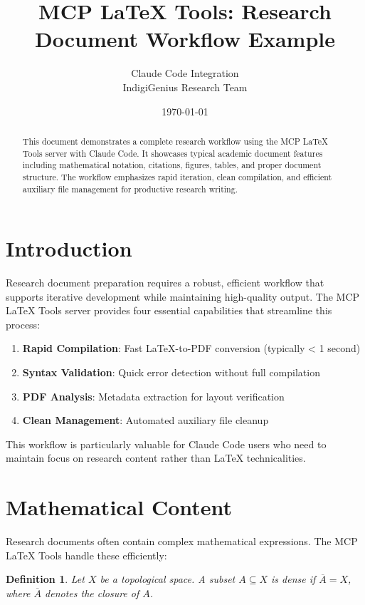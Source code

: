 \documentclass[12pt]{article}
\title{MCP LaTeX Tools: Research Document Workflow Example}
\author{Claude Code Integration\\
        IndigiGenius Research Team}
\date{\today}
\newtheorem{definition}{Definition}
\begin{document}
\maketitle

\doublespacing

\begin{abstract}
This document demonstrates a complete research workflow using the MCP LaTeX Tools server with Claude Code. It showcases typical academic document features including mathematical notation, citations, figures, tables, and proper document structure. The workflow emphasizes rapid iteration, clean compilation, and efficient auxiliary file management for productive research writing.
\end{abstract}

\section{Introduction}

Research document preparation requires a robust, efficient workflow that supports iterative development while maintaining high-quality output. The MCP LaTeX Tools server provides four essential capabilities that streamline this process:

\begin{enumerate}
    \item \textbf{Rapid Compilation}: Fast LaTeX-to-PDF conversion (typically < 1 second)
    \item \textbf{Syntax Validation}: Quick error detection without full compilation
    \item \textbf{PDF Analysis}: Metadata extraction for layout verification
    \item \textbf{Clean Management}: Automated auxiliary file cleanup
\end{enumerate}

This workflow is particularly valuable for Claude Code users who need to maintain focus on research content rather than LaTeX technicalities.

\section{Mathematical Content}

Research documents often contain complex mathematical expressions. The MCP LaTeX Tools handle these efficiently:

\begin{definition}
Let $X$ be a topological space. A subset $A \subseteq X$ is \emph{dense} if $\overline{A} = X$, where $\overline{A}$ denotes the closure of $A$.
\end{definition}
\end{document}
